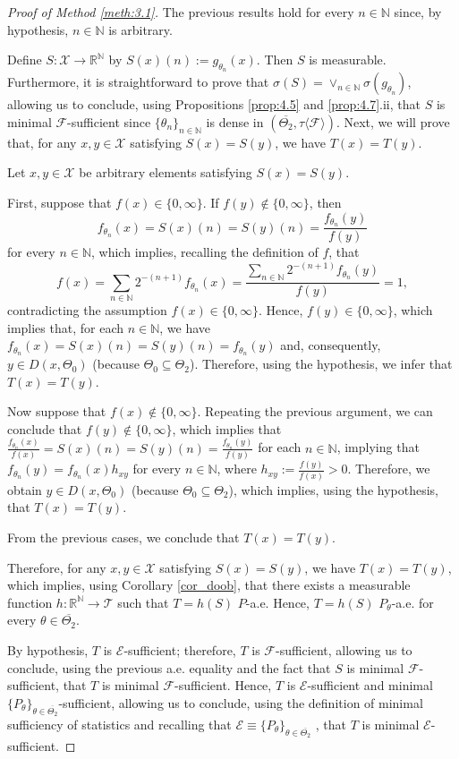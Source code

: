 \documentclass[12pt]{article}
\begin{document}
\begin{proof}[Proof of Method \ref{meth:3.1}]
The previous results hold for every $n\in\mathbb{N}$ since, by hypothesis, $n\in\mathbb{N}$ is arbitrary.

Define $S:\mathcal{X}\to \mathbb{R}^\mathbb{N}$ by $S(x)(n):=g_{\theta _n}(x)$. Then $S$ is measurable. Furthermore, it is straightforward to prove that $\sigma (S)=\vee _{n\in\mathbb{N}}\sigma (g_{\theta _n})$, allowing us to conclude, using Propositions \ref{prop:4.5} and \ref{prop:4.7}.ii, that $S$ is minimal $\mathcal{F}$-sufficient since $\{\theta _n\}_{n\in\mathbb{N}}$ is dense in $(\overline{\Theta _2},\tau \langle \mathcal{F}\rangle )$. Next, we will prove that, for any $x,y\in\mathcal{X}$ satisfying $S(x)=S(y)$, we have $T(x)=T(y)$.

Let $x,y\in\mathcal{X}$ be arbitrary elements satisfying $S(x)=S(y)$.

First, suppose that $f(x)\in \{0,\infty \}$. If $f(y)\notin \{0,\infty \}$, then $$f_{\theta _n}(x)=S(x)(n)=S(y)(n)=\frac{f_{\theta _n}(y)}{f(y)}$$ for every $n\in\mathbb{N}$, which implies, recalling the definition of $f$, that $$f(x)=\sum _{n\in\mathbb{N}}2^{-(n+1)}f_{\theta _n}(x)=\frac{\sum _{n\in\mathbb{N}}2^{-(n+1)}f_{\theta _n}(y)}{f(y)}=1,$$ contradicting the assumption $f(x)\in \{0,\infty \}$. Hence, $f(y)\in \{0,\infty \}$, which implies that, for each $n\in\mathbb{N}$, we have $f_{\theta _n}(x)=S(x)(n)=S(y)(n)=f_{\theta _n}(y)$ and, consequently, $y\in D(x,\Theta _0)$ (because $\Theta _0\subseteq\Theta _2$). Therefore, using the hypothesis, we infer that $T(x)=T(y)$.

Now suppose that $f(x)\notin \{0,\infty \}$. Repeating the previous argument, we can conclude that $f(y)\notin \{0,\infty \}$, which implies that $\frac{f_{\theta _n}(x)}{f(x)}=S(x)(n)=S(y)(n)=\frac{f_{\theta _n}(y)}{f(y)}$ for each $n\in\mathbb{N}$, implying that $f_{\theta _n}(y)=f_{\theta _n}(x)h_{xy}$ for every $n\in\mathbb{N}$, where $h_{xy}:=\frac{f(y)}{f(x)}>0$. Therefore, we obtain $y\in D(x,\Theta _0)$ (because $\Theta _0\subseteq\Theta _2$), which implies, using the hypothesis, that $T(x)=T(y)$.

From the previous cases, we conclude that $T(x)=T(y)$.

Therefore, for any $x,y\in\mathcal{X}$ satisfying $S(x)=S(y)$, we have $T(x)=T(y)$, which implies, using Corollary \ref{cor_doob}, that there exists a measurable function $h:\mathbb{R}^\mathbb{N}\to \mathcal{T}$ such that $T=h(S)$ $P$-a.e. Hence, $T=h(S)$ $P_\theta$-a.e. for every $\theta\in\overline{\Theta_2}$.

By hypothesis, $T$ is $\mathcal{E}$-sufficient; therefore, $T$ is $\mathcal{F}$-sufficient, allowing us to conclude, using the previous a.e. equality and the fact that $S$ is minimal $\mathcal{F}$-sufficient, that $T$ is minimal $\mathcal{F}$-sufficient. Hence, $T$ is $\mathcal{E}$-sufficient and minimal $\{P_\theta\}_{\theta\in\overline{\Theta _2}}$-sufficient, allowing us to conclude, using the definition of minimal sufficiency of statistics and recalling that $\mathcal{E}\equiv \{P_\theta \}_{\theta\in\overline{\Theta _2}}$ , that $T$ is minimal $\mathcal{E}$-sufficient.
\end{proof}
\end{document}
